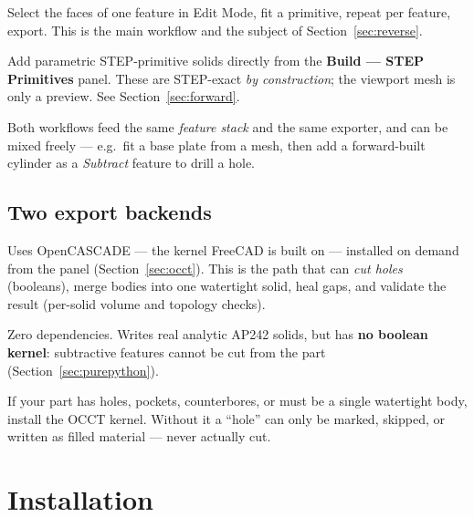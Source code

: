 \documentclass[11pt,a4paper]{article}
\newcommand{\ui}[1]{\textsf{\textbf{#1}}}   %
\begin{document}
\begin{description}[style=nextline]
  \item[Reverse (mesh $\to$ CAD)] Select the faces of one feature in Edit
    Mode, fit a primitive, repeat per feature, export. This is the main
    workflow and the subject of Section~\ref{sec:reverse}.
  \item[Forward (build $\to$ CAD)] Add parametric STEP-primitive solids
    directly from the \ui{Build --- STEP Primitives} panel. These are
    STEP-exact \emph{by construction}; the viewport mesh is only a preview.
    See Section~\ref{sec:forward}.
\end{description}

Both workflows feed the same \emph{feature stack} and the same exporter, and
can be mixed freely --- e.g.\ fit a base plate from a mesh, then add a
forward-built cylinder as a \emph{Subtract} feature to drill a hole.

\subsection{Two export backends}
\label{sec:backends}

\begin{description}[style=nextline]
  \item[OCCT kernel (recommended)] Uses OpenCASCADE --- the kernel FreeCAD is
    built on --- installed on demand from the panel (Section~\ref{sec:occt}).
    This is the path that can \emph{cut holes} (booleans), merge bodies into
    one watertight solid, heal gaps, and validate the result (per-solid
    volume and topology checks).
  \item[Pure-Python writer (fallback)] Zero dependencies. Writes real analytic
    AP242 solids, but has \textbf{no boolean kernel}: subtractive features
    cannot be cut from the part (Section~\ref{sec:purepython}).
\end{description}

\begin{warnbox}
If your part has holes, pockets, counterbores, or must be a single watertight
body, install the OCCT kernel. Without it a ``hole'' can only be marked,
skipped, or written as filled material --- never actually cut.
\end{warnbox}

\section{Installation}
\end{document}
